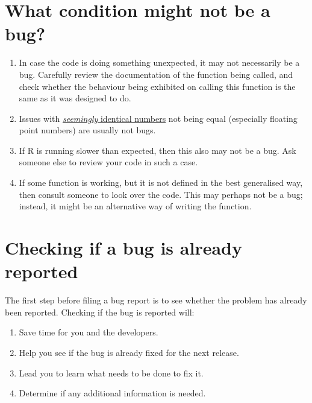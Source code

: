 \documentclass[
]{book}
\begin{document}
\hypertarget{what-condition-might-not-be-a-bug}{%
\section{What condition might not be a bug?}\label{what-condition-might-not-be-a-bug}}

\begin{enumerate}
\def\labelenumi{\arabic{enumi}.}
\item
  In case the code is doing something unexpected, it may not necessarily be a bug. Carefully review the documentation of the function being called, and check whether the behaviour being exhibited on calling this function is the same as it was designed to do.
\item
  Issues with \href{https://cran.r-project.org/doc/FAQ/R-FAQ.html\#Why-doesn_0027t-R-think-these-numbers-are-equal_003f}{\emph{seemingly} identical numbers} not being equal (especially floating point numbers) are usually not bugs.
\item
  If R is running slower than expected, then this also may not be a bug. Ask someone else to review your code in such a case.
\item
  If some function is working, but it is not defined in the best generalised way, then consult someone to look over the code. This may perhaps not be a bug; instead, it might be an alternative way of writing the function.
\end{enumerate}

\hypertarget{checking-if-a-bug-is-already-reported}{%
\section{Checking if a bug is already reported}\label{checking-if-a-bug-is-already-reported}}

The first step before filing a bug report is to see whether the problem has already been reported. Checking if the bug is reported will:

\begin{enumerate}
\def\labelenumi{\arabic{enumi}.}
\item
  Save time for you and the developers.
\item
  Help you see if the bug is already fixed for the next release.
\item
  Lead you to learn what needs to be done to fix it.
\item
  Determine if any additional information is needed.
\end{enumerate}
\end{document}
